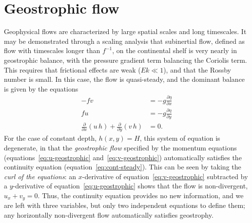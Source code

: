 \documentclass[11pt]{report}
\numberwithin{equation}{section}
\begin{document}

\section{Geostrophic flow}

Geophysical flows are characterized by large spatial scales and long timescales.  It may be demonstrated through a scaling analysis that subinertial flow, defined as flow with timescales longer than $f^{-1}$, on the continental shelf is very nearly in geostrophic balance, with the pressure gradient term balancing the Coriolis term.  This requires that frictional effects are weak ($Ek\ll1$), and that the Rossby number is small.  In this case, the flow is quasi-steady, and the dominant balance is given by the equations
\begin{align}
     - fv 
                &= -g\frac{\partial \eta}{\partial x} \label{eq:u-geostrophic} \\
    fu 
                &= -g\frac{\partial \eta}{\partial y}  \label{eq:v-geostrophic} \\
    \frac{\partial}{\partial x} (u\,h)
        + \frac{\partial }{\partial y} (v\,h)
                &= 0 . \label{eq:cont-steady}
\end{align}
For the case of constant depth, $h(x, y)=H$, this system of equation is degenerate, in that the {\it geostrophic flow} specified by the momentum equations (equations~\ref{eq:u-geostrophic} and~\ref{eq:v-geostrophic}) automatically satisfies the continuity equation (equation~\ref{eq:cont-steady}).  This can be seen by taking the {\it curl of the equations}: an $x$-derivative of equation~\ref{eq:v-geostrophic} subtracted by a $y$-derivative of equation~\ref{eq:u-geostrophic} shows that the flow is non-divergent, $u_x + v_y = 0$.  Thus, the continuity equation provides no new information, and we are left with three variables, but only two independent equations to define them; any horizontally non-divergent flow automatically satisfies geostrophy.
\end{document}
